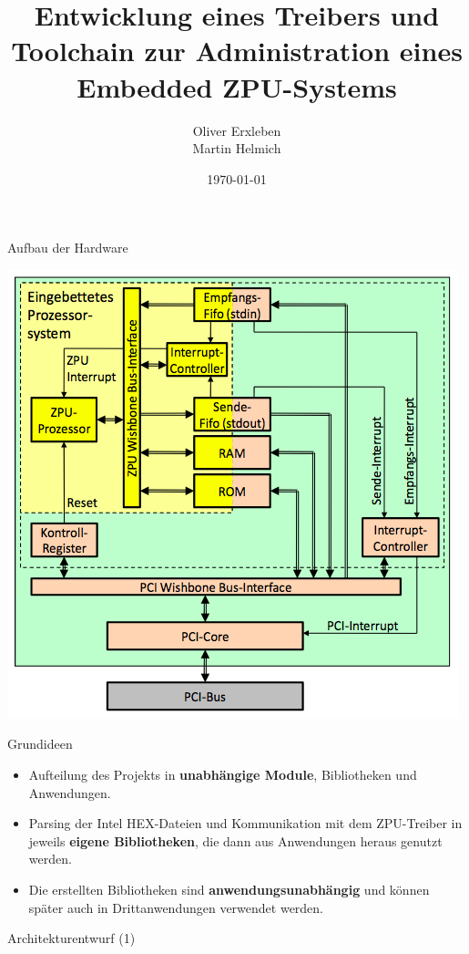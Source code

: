 \documentclass[10pt]{beamer}
\title{Entwicklung eines Treibers und Toolchain zur Administration eines Embedded ZPU-Systems}
\author{Oliver Erxleben\\Martin Helmich}
\institute{Hochschule Osnabrück}
\date{\today}
\begin{document}
	\frame{\titlepage}
	
	\begin{frame}{Aufbau der Hardware}
		\begin{center}
		\includegraphics[height=0.9\textheight]{images/zpu_architecture.png}
		\end{center}
	\end{frame}
	
	\begin{frame}{Grundideen}
		\begin{itemize}
			\item Aufteilung des Projekts in \textbf{unabhängige Module}, Bibliotheken und Anwendungen.
			\item Parsing der Intel HEX-Dateien und Kommunikation mit dem ZPU-Treiber in jeweils \textbf{eigene Bibliotheken}, die dann aus Anwendungen heraus genutzt werden.
			\item Die erstellten Bibliotheken sind \textbf{anwendungsunabhängig} und können später auch in Drittanwendungen verwendet werden.
		\end{itemize}
	\end{frame}

	\begin{frame}{Architekturentwurf (1)}
	\begin{center}
		
	\end{center}
	\end{frame}
	
\end{document}
